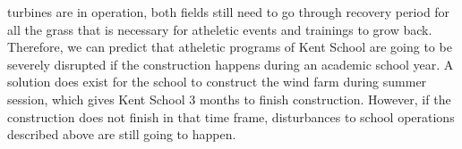 \documentclass[review]{elsarticle}
\begin{document}
turbines are in operation, both fields still need to go through recovery period for all the grass that is necessary for atheletic events and trainings to grow back. Therefore, we 
can predict that atheletic programs of Kent School are going to be severely disrupted if the construction happens during an academic school year. A solution does exist for the school 
to construct the wind farm during summer session, which gives Kent School 3 months to finish construction. However, if the construction does not finish in that time frame, disturbances 
to school operations described above are still going to happen. %
\\\indent 

        

\clearpage
    
\end{document}
